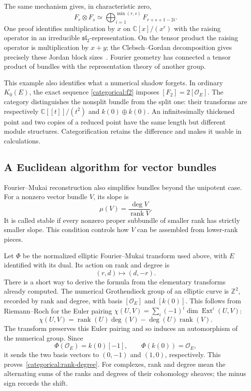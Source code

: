 \documentclass[11pt]{article}
\theoremstyle{remark}
\begin{document}
The same mechanism gives, in characteristic zero,
\begin{equation}
F_r\otimes F_s\simeq
\bigoplus_{i=1}^{\min(r,s)}F_{r+s+1-2i}.
\label{categorical:clebsch-gordan}
\end{equation}
One proof identifies multiplication by \(x\) on \(\mathbb C[x]/(x^r)\) with the raising operator in an irreducible \(\mathfrak{sl}_2\)-representation. On the tensor product the raising operator is multiplication by \(x+y\); the Clebsch--Gordan decomposition gives precisely these Jordan block sizes~\cite{chen}. Fourier geometry has connected a tensor product of bundles with the representation theory of another group.

This example also identifies what a numerical shadow forgets. In ordinary \(K_0(E)\), the exact sequence \eqref{categorical:f2} imposes \([F_2]=2[\mathcal O_E]\). The category distinguishes the nonsplit bundle from the split one: their transforms are respectively \(\mathbb C[[t]]/(t^2)\) and \(k(0)\oplus k(0)\). An infinitesimally thickened point and two copies of a reduced point have the same length but different module structures. Categorification retains the difference and makes it usable in calculations.


\subsection{A Euclidean algorithm for vector bundles}
\label{categorical:euclidean-bundles}

Fourier--Mukai reconstruction also simplifies bundles beyond the unipotent case. For a nonzero vector bundle \(V\), its slope is
\[
\mu(V)=\frac{\deg V}{\operatorname{rank}V}.
\]
It is called stable if every nonzero proper subbundle of smaller rank has strictly smaller slope. This condition controls how \(V\) can be assembled from lower-rank pieces.

Let \(\Phi\) be the normalized elliptic Fourier--Mukai transform used above, with \(E\) identified with its dual. Its action on rank and degree is
\begin{equation}
(r,d)\longmapsto(d,-r).
\label{categorical:rank-degree}
\end{equation}
There is a short way to derive the formula from the elementary transforms already computed. The numerical Grothendieck group of an elliptic curve is \(\mathbb Z^2\), recorded by rank and degree, with basis \([\mathcal O_E]\) and \([k(0)]\). This follows from Riemann--Roch for the Euler pairing \(\chi(U,V)=\sum_i(-1)^i\dim\operatorname{Ext}^i(U,V)\):
\[
\chi(U,V)=\operatorname{rank}(U)\deg(V)-\deg(U)\operatorname{rank}(V).
\]
The transform preserves this Euler pairing and so induces an automorphism of the numerical group. Since
\[
\Phi(\mathcal O_E)=k(0)[-1],\qquad
\Phi(k(0))=\mathcal O_E,
\]
it sends the two basis vectors to \((0,-1)\) and \((1,0)\), respectively. This proves~\eqref{categorical:rank-degree}. For complexes, rank and degree mean the alternating sums of the ranks and degrees of their cohomology sheaves; the minus sign records the shift.
\end{document}
